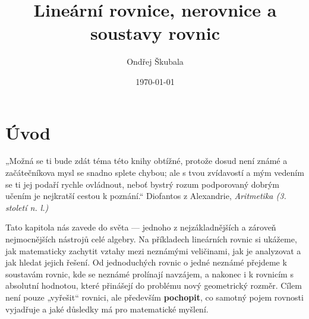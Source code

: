 \documentclass[12pt,a4paper]{article}
\title{Lineární rovnice, nerovnice a soustavy rovnic}
\author{Ondřej Škubala}
\date{\today}
\begin{document}
\maketitle
\newpage

\section{Úvod}

\begin{quotebox}
{„Možná se ti bude zdát téma této knihy obtížné, protože dosud není známé a začátečníkova mysl se snadno splete chybou; ale s tvou zvídavostí a mým vedením se ti jej podaří rychle ovládnout, neboť bystrý rozum podporovaný dobrým učením je nejkratší cestou k poznání.“}
{Diofantos z Alexandrie, \textit{Aritmetika (3. století n. l.)}}
\end{quotebox}

\noindent
Tato kapitola nás zavede do světa  — jednoho z nejzákladnějších a zároveň nejmocnějších nástrojů celé algebry.  
Na příkladech lineárních rovnic si ukážeme, jak matematicky zachytit vztahy mezi neznámými veličinami, jak je analyzovat a jak hledat jejich řešení.  
Od jednoduchých rovnic o jedné neznámé přejdeme k soustavám rovnic, kde se neznámé prolínají navzájem, a nakonec i k rovnicím s absolutní hodnotou, které přinášejí do problému nový geometrický rozměr.  
Cílem není pouze „vyřešit“ rovnici, ale především \textbf{pochopit}, co samotný pojem rovnosti vyjadřuje a jaké důsledky má pro matematické myšlení.
\end{document}
